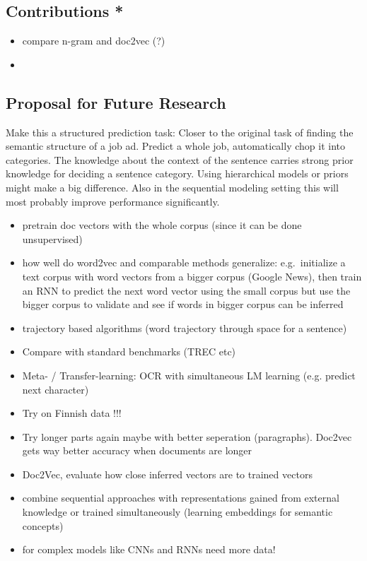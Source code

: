 \subsection{Contributions *}
\label{sub:contributions}

\begin{itemize}
  \item compare n-gram and doc2vec (?)
  \item
\end{itemize}

\subsection{Proposal for Future Research}
\label{sub:further-research}

Make this a structured prediction task: Closer to the original task of finding the semantic structure of a job ad. Predict a whole job, automatically chop it into categories. The knowledge about the context of the sentence carries strong prior knowledge for deciding a sentence category. Using hierarchical models or priors might make a big difference. Also in the sequential modeling setting this will most probably improve performance significantly.

\begin{itemize}
	\item pretrain doc vectors with the whole corpus (since it can be done unsupervised)
  \item how well do word2vec and comparable methods generalize: e.g.\ initialize a text corpus with word vectors from a bigger corpus (Google News), then train an RNN to predict the next word vector using the small corpus but use the bigger corpus to validate and see if words in bigger corpus can be inferred
  \item trajectory based algorithms (word trajectory through space for a sentence)
  \item Compare with standard benchmarks (TREC etc)
  \item Meta- / Transfer-learning: OCR with simultaneous LM learning (e.g. predict next character)
  \item Try on Finnish data !!!
  \item Try longer parts again maybe with better seperation (paragraphs). Doc2vec gets way better accuracy when documents are longer
  \item Doc2Vec, evaluate how close inferred vectors are to trained vectors
  \item combine sequential approaches with representations gained from external knowledge or trained simultaneously (learning embeddings for semantic concepts)
  \item for complex models like CNNs and RNNs need more data!
  \
\end{itemize}


